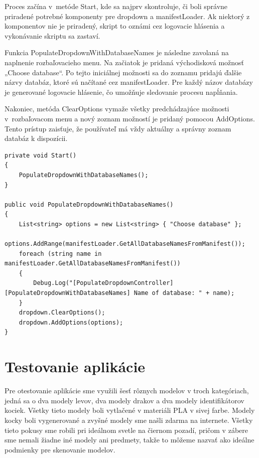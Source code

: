 Proces začína v~metóde Start, kde sa najprv skontroluje, či boli správne priradené potrebné komponenty pre dropdown a manifestLoader. Ak niektorý z komponentov nie je priradený, skript to oznámi cez logovacie hlásenia a vykonávanie skriptu sa zastaví.

Funkcia PopulateDropdownWithDatabaseNames je následne zavolaná na naplnenie rozbaľovacieho menu. Na začiatok je pridaná východisková možnosť „Choose database“. Po tejto iniciálnej možnosti sa do zoznamu pridajú ďalšie názvy databáz, ktoré sú načítané cez manifestLoader. Pre každý názov databázy je generované logovacie hlásenie, čo umožňuje sledovanie procesu napĺňania.

Nakoniec, metóda ClearOptions vymaže všetky predchádzajúce možnosti v~rozbaľovacom menu a nový zoznam možností je pridaný pomocou AddOptions. Tento prístup zaisťuje, že používateľ má vždy aktuálny a správny zoznam databáz k dispozícii.

\lstset{style=Csharp}
\begin{lstlisting}[caption={PopulateDropdownController Class - Čítanie z xml a pridávanie databáz do rozbaľovacieho listu}, label=populateDropdownController]
private void Start()
{
    PopulateDropdownWithDatabaseNames();
}

public void PopulateDropdownWithDatabaseNames()
{
    List<string> options = new List<string> { "Choose database" };
    options.AddRange(manifestLoader.GetAllDatabaseNamesFromManifest());
    foreach (string name in manifestLoader.GetAllDatabaseNamesFromManifest())
    {
        Debug.Log("[PopulateDropdownController] [PopulateDropdownWithDatabaseNames] Name of database: " + name);
    }
    dropdown.ClearOptions();
    dropdown.AddOptions(options);
}
\end{lstlisting} 

\section{Testovanie aplikácie}

Pre otestovanie aplikácie sme využili šesť rôznych modelov v troch kategóriach, jedná sa o dva modely levov, dva modely drakov a dva modely identifikátorov kociek. Všetky tieto modely boli vytlačené v materiáli PLA v sivej farbe. Modely kocky boli vygenerované a zvyšné modely sme našli zdarma na internete. Všetky tieto pokusy sme robili pri ideálnom svetle na čiernom pozadí, pričom v zábere sme nemali žiadne iné modely ani predmety, takže to môžeme nazvať ako ideálne podmienky pre skenovanie modelov. 

